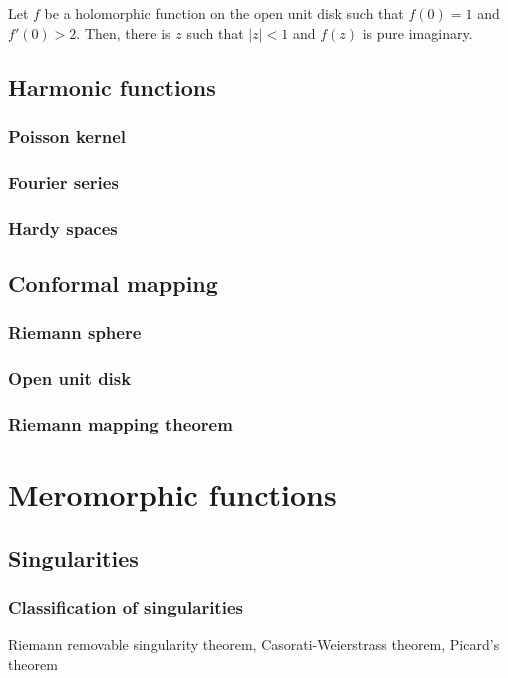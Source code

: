 \documentclass{../note}
\begin{document}
\begin{prb}
Let $f$ be a holomorphic function on the open unit disk such that $f(0)=1$ and $f'(0)>2$.
Then, there is $z$ such that $|z|<1$ and $f(z)$ is pure imaginary.
\end{prb}


\chapter{Harmonic functions}
\section{Poisson kernel}
\section{Fourier series}
\section{Hardy spaces}


\chapter{Conformal mapping}
\section{Riemann sphere}
\section{Open unit disk}
\section{Riemann mapping theorem}








\part{Meromorphic functions}


\chapter{Singularities}

\section{Classification of singularities}
Riemann removable singularity theorem,
Casorati-Weierstrass theorem,
Picard's theorem
\end{document}
